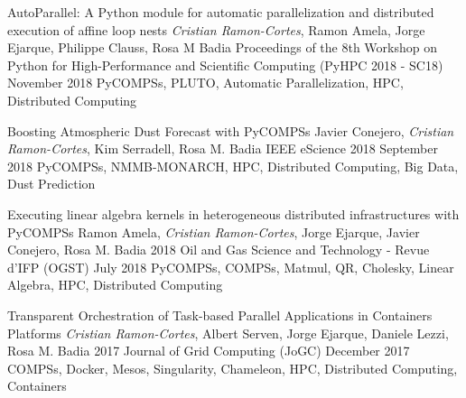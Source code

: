 %
%
%

\newpage


\begin{publications}
    
    \publication
        {AutoParallel: A Python module for automatic parallelization and distributed execution of affine loop nests}
        {\textit{Cristian Ramon-Cortes}, Ramon Amela, Jorge Ejarque, Philippe Clauss, Rosa M Badia}
        {Proceedings of the 8th Workshop on Python for High-Performance and Scientific Computing (PyHPC 2018 - SC18)}
        {November 2018}
        {PyCOMPSs, PLUTO, Automatic Parallelization, HPC, Distributed Computing}
        {}
        
    \publication
        {Boosting Atmospheric Dust Forecast with PyCOMPSs}
        {Javier Conejero, \textit{Cristian Ramon-Cortes}, Kim Serradell, Rosa M. Badia}
        {IEEE eScience 2018}
        {September 2018}
        {PyCOMPSs, NMMB-MONARCH, HPC, Distributed Computing, Big Data, Dust Prediction}
        {}
        
    \publication
        {Executing linear algebra kernels in heterogeneous distributed infrastructures with PyCOMPSs}
        {Ramon Amela, \textit{Cristian Ramon-Cortes}, Jorge Ejarque, Javier Conejero, Rosa M. Badia}
        {2018 Oil and Gas Science and Technology - Revue d’IFP (OGST)}
        {July 2018}
        {PyCOMPSs, COMPSs, Matmul, QR, Cholesky, Linear Algebra, HPC, Distributed Computing}
        {}

    \publication
        {Transparent Orchestration of Task-based Parallel Applications in Containers Platforms}
        {\textit{Cristian Ramon-Cortes}, Albert Serven, Jorge Ejarque, Daniele Lezzi, Rosa M. Badia}
        {2017 Journal of Grid Computing (JoGC)}
        {December 2017}
        {COMPSs, Docker, Mesos, Singularity, Chameleon, HPC, Distributed Computing, Containers}
        {}
        

\end{publications}
